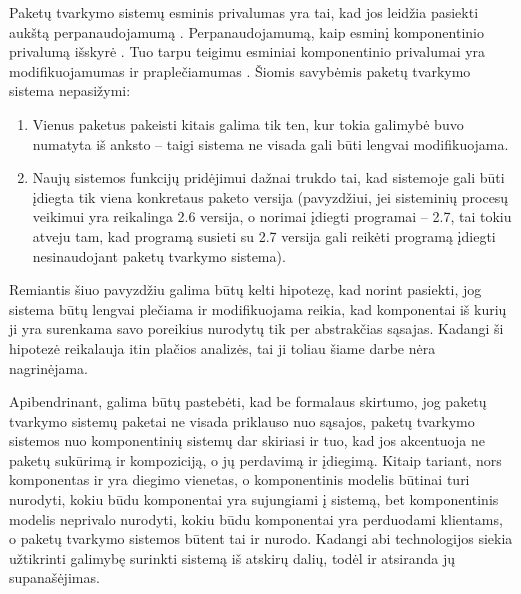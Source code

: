 Paketų tvarkymo sistemų esminis privalumas yra tai, kad jos leidžia
pasiekti aukštą perpanaudojamumą . Perpanaudojamumą,
kaip esminį komponentinio privalumą išskyrė 
\cite{what-to-compose}.
Tuo tarpu  \cite{point-counterpoint}
teigimu esminiai komponentinio privalumai yra modifikuojamumas
 ir praplečiamumas . Šiomis
savybėmis  paketų tvarkymo sistema nepasižymi:
\begin{enumerate}
  \item Vienus paketus pakeisti kitais galima tik ten, kur tokia galimybė
    buvo numatyta iš anksto – taigi sistema ne visada gali būti
    lengvai modifikuojama.
  \item Naujų sistemos funkcijų pridėjimui dažnai trukdo tai,
    kad sistemoje gali būti įdiegta tik viena konkretaus paketo
    versija (pavyzdžiui, jei sisteminių procesų veikimui yra reikalinga
    2.6  versija, o norimai įdiegti programai – 2.7,
    tai tokiu atveju tam, kad programą susieti su 2.7 versija gali
    reikėti programą įdiegti nesinaudojant paketų tvarkymo sistema).
\end{enumerate}
Remiantis šiuo pavyzdžiu galima būtų kelti hipotezę, kad norint
pasiekti, jog sistema būtų lengvai plečiama ir modifikuojama reikia,
kad komponentai iš kurių ji yra surenkama savo poreikius nurodytų
tik per abstrakčias sąsajas. Kadangi ši hipotezė reikalauja itin
plačios analizės, tai ji toliau šiame darbe nėra nagrinėjama.

Apibendrinant, galima būtų pastebėti, kad be formalaus skirtumo, jog
paketų tvarkymo sistemų paketai ne visada priklauso nuo sąsajos,
paketų tvarkymo sistemos nuo komponentinių sistemų dar skiriasi ir
tuo, kad jos akcentuoja ne paketų sukūrimą ir kompoziciją, o jų
perdavimą ir įdiegimą. Kitaip tariant, nors komponentas ir yra
diegimo vienetas, o komponentinis modelis būtinai turi nurodyti,
kokiu būdu komponentai yra sujungiami į sistemą, bet komponentinis
modelis neprivalo nurodyti, kokiu būdu komponentai yra perduodami
klientams, o paketų tvarkymo sistemos būtent tai ir nurodo. Kadangi
abi technologijos siekia užtikrinti galimybę surinkti sistemą
iš atskirų dalių, todėl ir atsiranda jų supanašėjimas.
